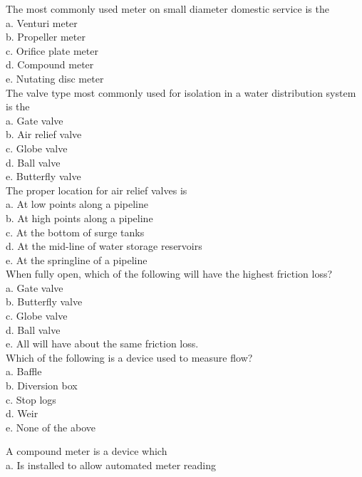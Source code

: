   The most commonly used meter on small diameter domestic service is the\\
a. Venturi meter\\
b. Propeller meter\\
c. Orifice plate meter\\
d. Compound meter\\
e. Nutating disc meter\\

  The valve type most commonly used for isolation in a water distribution system is the\\
a. Gate valve\\

b. Air relief valve\\

c. Globe valve\\

d. Ball valve\\

e. Butterfly valve\\

  The proper location for air relief valves is\\
a. At low points along a pipeline\\
b. At high points along a pipeline\\
c. At the bottom of surge tanks\\
d. At the mid-line of water storage reservoirs\\
e. At the springline of a pipeline\\

  When fully open, which of the following will have the highest friction loss?\\
a. Gate valve\\
b. Butterfly valve\\
c. Globe valve\\
d. Ball valve\\
e. All will have about the same friction loss.\\

  Which of the following is a device used to measure flow?\\
a. Baffle\\
b. Diversion box\\
c. Stop logs\\
d. Weir\\
e. None of the above 

A compound meter is a device which\\
a. Is installed to allow automated meter reading\\

